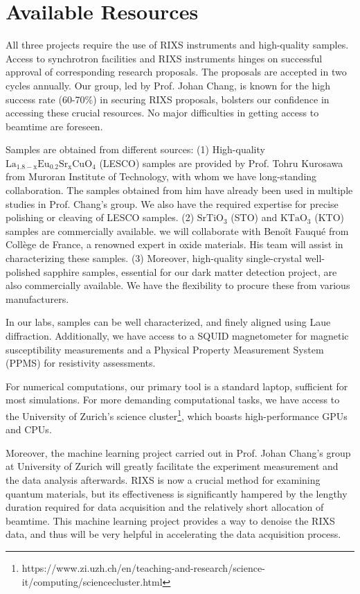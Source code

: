 \documentclass[11pt]{article}
\begin{document}
\section{Available Resources}
All three projects require the use of RIXS instruments and high-quality samples. Access to synchrotron facilities and RIXS instruments hinges on successful approval of corresponding research proposals. The proposals are accepted in two cycles annually. Our group, led by Prof. Johan Chang, is known for the high success rate (60-70\%) in securing RIXS proposals, bolsters our confidence in accessing these crucial resources. No major difficulties in getting access to beamtime are foreseen. 

Samples are obtained from different sources: (1) High-quality $\mathrm{La_{1.8-x}Eu_{0.2}Sr_xCuO_{4}}$ (LESCO) samples are provided by Prof. Tohru Kurosawa from Muroran Institute of Technology, with whom we have long-standing collaboration. The samples obtained from him have already been used in multiple studies\cite{choi2022unveiling,wang_charge_2021} in Prof. Chang's group. We also have the required expertise for precise polishing or cleaving of LESCO samples. (2) $\mathrm{SrTiO_{3}}$ (STO) and $\mathrm{KTaO_{3}}$ (KTO) samples are commercially available. we will collaborate with Benoît Fauqué from Collège de France, a renowned expert in oxide materials. His team will assist in characterizing these samples. (3) Moreover, high-quality single-crystal well-polished sapphire samples, essential for our dark matter detection project, are also commercially available. We have the flexibility to procure these from various manufacturers. 

In our labs, samples can be well characterized, and finely aligned using Laue diffraction. Additionally, we have access to a SQUID magnetometer for magnetic susceptibility measurements and a Physical Property Measurement System (PPMS) for resistivity assessments.

For numerical computations, our primary tool is a standard laptop, sufficient for most simulations. For more demanding computational tasks, we have access to the University of Zurich's science cluster\footnote{https://www.zi.uzh.ch/en/teaching-and-research/science-it/computing/sciencecluster.html}, which boasts high-performance GPUs and CPUs.

Moreover, the machine learning project carried out in Prof. Johan Chang's group at University of Zurich will greatly facilitate the experiment measurement and the data analysis afterwards. RIXS is now a crucial method for examining quantum materials, but its effectiveness is significantly hampered by the lengthy duration required for data acquisition and the relatively short allocation of beamtime. This machine learning project provides a way to denoise the RIXS data, and thus will be very helpful in accelerating the data acquisition process.  
\end{document}

